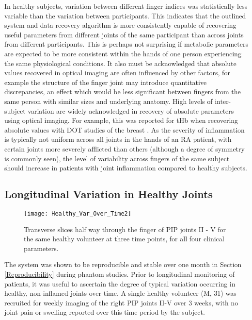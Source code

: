 \documentclass[twoside]{bhamthesis}
\theoremstyle{definition}
\begin{document}
In healthy subjects, variation between different finger indices was statistically less variable than the variation between participants. This indicates that the outlined system and data recovery algorithm is more consistently capable of recovering useful parameters from different joints of the same participant than across joints from different participants. This is perhaps not surprising if metabolic parameters are expected to be more consistent within the hands of one person experiencing the same physiological conditions. It also must be acknowledged that absolute values recovered in optical imaging are often influenced by other factors, for example the structure of the finger joint may introduce quantitative discrepancies, an effect which would be less significant between fingers from the same person with similar sizes and underlying anatomy. High levels of inter-subject variation are widely acknowledged in recovery of absolute parameters using optical imaging. For example, this was reported for tHb when recovering absolute values with DOT studies of the breast \cite{shah2001noninvasive,cubeddu2000effects}. As the severity of inflammation is typically not uniform across all joints in the hands of an RA patient, with certain joints more severely afflicted than others \cite{arnett1988american} (although a degree of symmetry is commonly seen), the level of variability across fingers of the same subject should increase in patients with joint inflammation compared to healthy subjects.

\subsection{Longitudinal Variation in Healthy Joints}
\label{Longitudinal Variation in Healthy Joints}

\begin{figure}[!ht]
\centering\texttt{[image: Healthy\_Var\_Over\_Time2]}
\caption{Transverse slices half way through the finger of PIP joints II - V for the same healthy volunteer at three time points, for all four clinical parameters.}
\label{Healthy_Var_Over_Time2}
\end{figure}

The system was shown to be reproducible and stable over one month in Section 
\ref{Reproducibility} during phantom studies. Prior to longitudinal monitoring of patients, it was useful to ascertain the degree of typical variation occurring in healthy, non-inflamed joints over time. A single healthy volunteer (M, 31) was recruited for weekly imaging of the right PIP joints II-V over 3 weeks, with no joint pain or swelling reported over this time period by the subject. 
\end{document}
